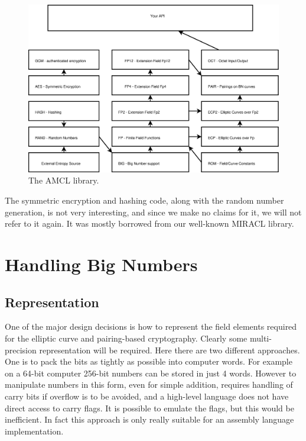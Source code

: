 \documentclass{llncs}
\begin{document}
\begin{figure}[!htb]
  \begin{center}
    \includegraphics[width=120mm ]{clint.eps}
  \end{center}
  \caption{\small The AMCL library.}
  \label{clint}
\end{figure}

The symmetric encryption and hashing code, along with the random number generation, is not very interesting, and since we make no claims for it, we will not refer to it again. It was mostly
borrowed from our well-known MIRACL library.

\section{Handling Big Numbers}

\subsection{Representation}

One of the major design decisions is how to represent the field elements required for the elliptic curve and pairing-based cryptography. 
Clearly some multi-precision representation will be required.  Here there are two different approaches. 
One is to pack the bits as tightly as possible into computer words. For example on a 64-bit computer 256-bit numbers can be stored in just 4 words. However to manipulate numbers in this 
form, even for simple addition, requires handling of carry bits if overflow is to be avoided, 
and a high-level language does not have direct access to carry flags. It is possible to emulate the flags, but this would be inefficient. In fact this approach is only really suitable 
for an assembly language implementation.
\end{document}
